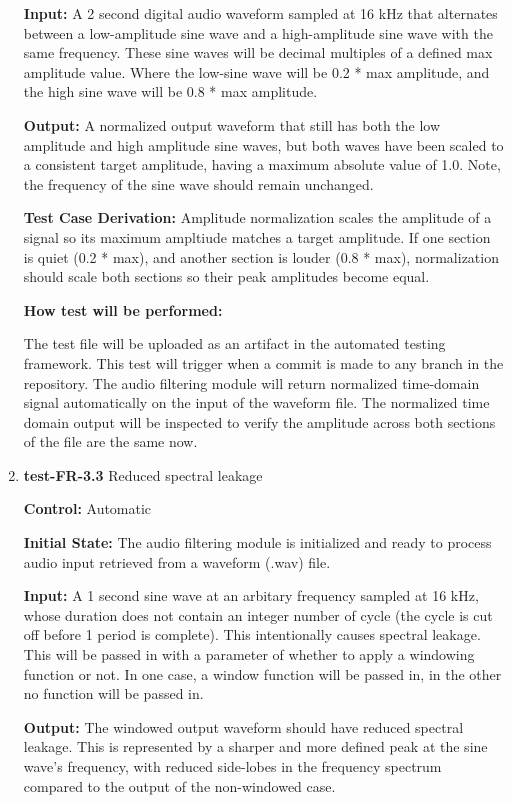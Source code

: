 \documentclass[12pt, titlepage]{article}
\begin{document}
\begin{enumerate}
\textbf{Input:}
A 2 second digital audio waveform sampled at 16 kHz that alternates between a 
low-amplitude sine wave and a high-amplitude sine wave with the same frequency. 
These sine waves will be decimal multiples of a defined max amplitude value. 
Where the low-sine wave will be 0.2 * max amplitude, and the high sine wave will
 be 0.8 * max amplitude. 
					
\textbf{Output:}
A normalized output waveform that still has both the low amplitude and high 
amplitude sine waves, but both waves have been scaled to a consistent target 
amplitude, having a maximum absolute value of 1.0. Note, the frequency of the 
sine wave should remain unchanged. 

\textbf{Test Case Derivation:} 
Amplitude normalization scales the amplitude of a signal so its maximum 
ampltiude matches a target amplitude. If one section is quiet (0.2 * max), and 
another section is louder (0.8 * max), normalization should scale both sections 
so their peak amplitudes become equal. 
					
\textbf{How test will be performed:}

The test file will be uploaded as an artifact in the automated testing 
framework. This test will trigger when a commit is made to any branch in the 
repository. The audio filtering module will return normalized time-domain 
signal automatically on the input of the waveform file. The normalized time 
domain output will be inspected to verify the amplitude across both sections of 
the file are the same now.

\item{\textbf{test-FR-3.3} Reduced spectral leakage\\}

\textbf{Control:} Automatic
					
\textbf{Initial State:} 
The audio filtering module is initialized and ready to process audio input 
retrieved from a waveform (.wav) file. 
					
\textbf{Input:}
A 1 second sine wave at an arbitary frequency sampled at 16 kHz, whose duration 
does not contain an integer number of cycle (the cycle is cut off before 1 
period is complete). This intentionally causes spectral leakage. This will be 
passed in with a parameter of whether to apply a windowing function or not. 
In one case, a window function will be passed in, in the other no function
will be passed in.
					
\textbf{Output:}
The windowed output waveform should have reduced spectral leakage. This is 
represented by a sharper and more defined peak at the sine wave's frequency,
with reduced side-lobes in the frequency spectrum compared to the output of the 
non-windowed case. 


\end{enumerate}
\end{document}
